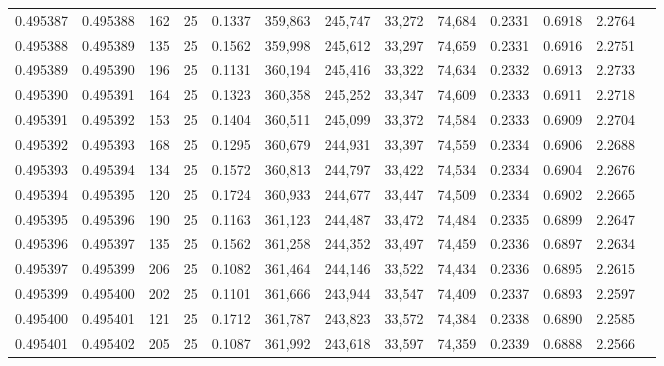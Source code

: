 \begin{tabular}{rrrrrrrrrrrrr}
0.495387 & 0.495388 &   162 &  25 &                                     0.1337 & 359,863 & 245,747 &  33,272 &  74,684 & 0.2331 & 0.6918 & 2.2764 \\
0.495388 & 0.495389 &   135 &  25 &                                     0.1562 & 359,998 & 245,612 &  33,297 &  74,659 & 0.2331 & 0.6916 & 2.2751 \\
0.495389 & 0.495390 &   196 &  25 &                                     0.1131 & 360,194 & 245,416 &  33,322 &  74,634 & 0.2332 & 0.6913 & 2.2733 \\
0.495390 & 0.495391 &   164 &  25 &                                     0.1323 & 360,358 & 245,252 &  33,347 &  74,609 & 0.2333 & 0.6911 & 2.2718 \\
0.495391 & 0.495392 &   153 &  25 &                                     0.1404 & 360,511 & 245,099 &  33,372 &  74,584 & 0.2333 & 0.6909 & 2.2704 \\
0.495392 & 0.495393 &   168 &  25 &                                     0.1295 & 360,679 & 244,931 &  33,397 &  74,559 & 0.2334 & 0.6906 & 2.2688 \\
0.495393 & 0.495394 &   134 &  25 &                                     0.1572 & 360,813 & 244,797 &  33,422 &  74,534 & 0.2334 & 0.6904 & 2.2676 \\
0.495394 & 0.495395 &   120 &  25 &                                     0.1724 & 360,933 & 244,677 &  33,447 &  74,509 & 0.2334 & 0.6902 & 2.2665 \\
0.495395 & 0.495396 &   190 &  25 &                                     0.1163 & 361,123 & 244,487 &  33,472 &  74,484 & 0.2335 & 0.6899 & 2.2647 \\
0.495396 & 0.495397 &   135 &  25 &                                     0.1562 & 361,258 & 244,352 &  33,497 &  74,459 & 0.2336 & 0.6897 & 2.2634 \\
0.495397 & 0.495399 &   206 &  25 &                                     0.1082 & 361,464 & 244,146 &  33,522 &  74,434 & 0.2336 & 0.6895 & 2.2615 \\
0.495399 & 0.495400 &   202 &  25 &                                     0.1101 & 361,666 & 243,944 &  33,547 &  74,409 & 0.2337 & 0.6893 & 2.2597 \\
0.495400 & 0.495401 &   121 &  25 &                                     0.1712 & 361,787 & 243,823 &  33,572 &  74,384 & 0.2338 & 0.6890 & 2.2585 \\
0.495401 & 0.495402 &   205 &  25 &                                     0.1087 & 361,992 & 243,618 &  33,597 &  74,359 & 0.2339 & 0.6888 & 2.2566 \\

\end{tabular}
